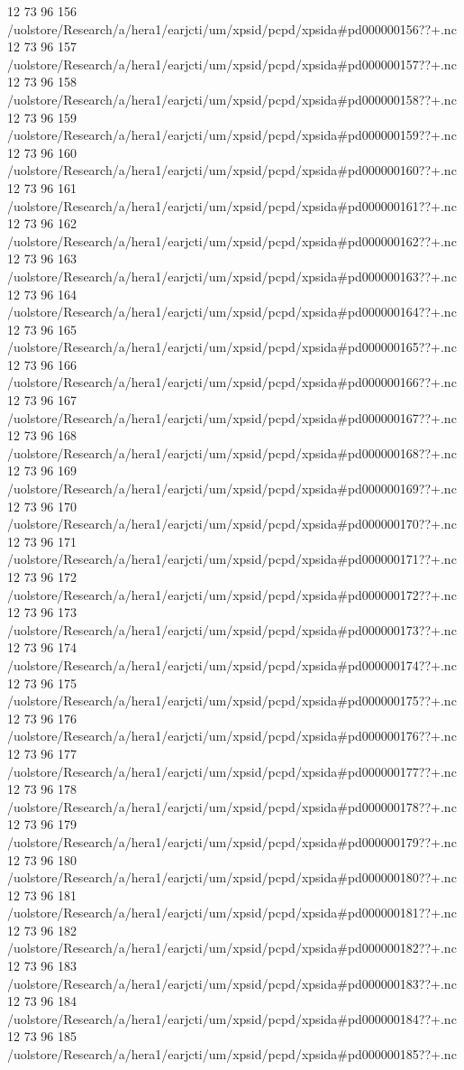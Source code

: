12 73 96
156
/uolstore/Research/a/hera1/earjcti/um/xpsid/pcpd/xpsida#pd000000156??+.nc
12 73 96
157
/uolstore/Research/a/hera1/earjcti/um/xpsid/pcpd/xpsida#pd000000157??+.nc
12 73 96
158
/uolstore/Research/a/hera1/earjcti/um/xpsid/pcpd/xpsida#pd000000158??+.nc
12 73 96
159
/uolstore/Research/a/hera1/earjcti/um/xpsid/pcpd/xpsida#pd000000159??+.nc
12 73 96
160
/uolstore/Research/a/hera1/earjcti/um/xpsid/pcpd/xpsida#pd000000160??+.nc
12 73 96
161
/uolstore/Research/a/hera1/earjcti/um/xpsid/pcpd/xpsida#pd000000161??+.nc
12 73 96
162
/uolstore/Research/a/hera1/earjcti/um/xpsid/pcpd/xpsida#pd000000162??+.nc
12 73 96
163
/uolstore/Research/a/hera1/earjcti/um/xpsid/pcpd/xpsida#pd000000163??+.nc
12 73 96
164
/uolstore/Research/a/hera1/earjcti/um/xpsid/pcpd/xpsida#pd000000164??+.nc
12 73 96
165
/uolstore/Research/a/hera1/earjcti/um/xpsid/pcpd/xpsida#pd000000165??+.nc
12 73 96
166
/uolstore/Research/a/hera1/earjcti/um/xpsid/pcpd/xpsida#pd000000166??+.nc
12 73 96
167
/uolstore/Research/a/hera1/earjcti/um/xpsid/pcpd/xpsida#pd000000167??+.nc
12 73 96
168
/uolstore/Research/a/hera1/earjcti/um/xpsid/pcpd/xpsida#pd000000168??+.nc
12 73 96
169
/uolstore/Research/a/hera1/earjcti/um/xpsid/pcpd/xpsida#pd000000169??+.nc
12 73 96
170
/uolstore/Research/a/hera1/earjcti/um/xpsid/pcpd/xpsida#pd000000170??+.nc
12 73 96
171
/uolstore/Research/a/hera1/earjcti/um/xpsid/pcpd/xpsida#pd000000171??+.nc
12 73 96
172
/uolstore/Research/a/hera1/earjcti/um/xpsid/pcpd/xpsida#pd000000172??+.nc
12 73 96
173
/uolstore/Research/a/hera1/earjcti/um/xpsid/pcpd/xpsida#pd000000173??+.nc
12 73 96
174
/uolstore/Research/a/hera1/earjcti/um/xpsid/pcpd/xpsida#pd000000174??+.nc
12 73 96
175
/uolstore/Research/a/hera1/earjcti/um/xpsid/pcpd/xpsida#pd000000175??+.nc
12 73 96
176
/uolstore/Research/a/hera1/earjcti/um/xpsid/pcpd/xpsida#pd000000176??+.nc
12 73 96
177
/uolstore/Research/a/hera1/earjcti/um/xpsid/pcpd/xpsida#pd000000177??+.nc
12 73 96
178
/uolstore/Research/a/hera1/earjcti/um/xpsid/pcpd/xpsida#pd000000178??+.nc
12 73 96
179
/uolstore/Research/a/hera1/earjcti/um/xpsid/pcpd/xpsida#pd000000179??+.nc
12 73 96
180
/uolstore/Research/a/hera1/earjcti/um/xpsid/pcpd/xpsida#pd000000180??+.nc
12 73 96
181
/uolstore/Research/a/hera1/earjcti/um/xpsid/pcpd/xpsida#pd000000181??+.nc
12 73 96
182
/uolstore/Research/a/hera1/earjcti/um/xpsid/pcpd/xpsida#pd000000182??+.nc
12 73 96
183
/uolstore/Research/a/hera1/earjcti/um/xpsid/pcpd/xpsida#pd000000183??+.nc
12 73 96
184
/uolstore/Research/a/hera1/earjcti/um/xpsid/pcpd/xpsida#pd000000184??+.nc
12 73 96
185
/uolstore/Research/a/hera1/earjcti/um/xpsid/pcpd/xpsida#pd000000185??+.nc
